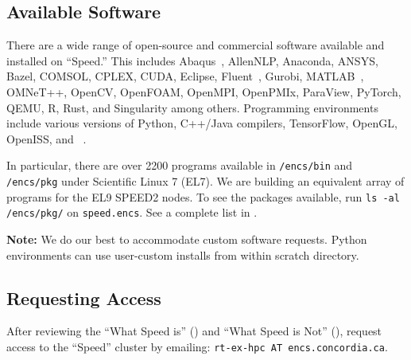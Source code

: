 \subsection{Available Software}
\label{sect:available-software}

There are a wide range of open-source and commercial software available and installed on ``Speed.''
This includes Abaqus~\cite{abaqus}, AllenNLP, Anaconda, ANSYS, Bazel,
COMSOL, CPLEX, CUDA, Eclipse, Fluent~\cite{fluent}, Gurobi, MATLAB~\cite{matlab,scholarpedia-matlab},
OMNeT++, OpenCV, OpenFOAM, OpenMPI, OpenPMIx, ParaView, PyTorch, QEMU, R, Rust, and Singularity among others.
Programming environments include various versions of Python, C++/Java compilers, TensorFlow, OpenGL, OpenISS, and {\marf}~\cite{marf}.

In particular, there are over 2200 programs available in \texttt{/encs/bin} and \texttt{/encs/pkg} under Scientific Linux 7 (EL7).
We are building an equivalent array of programs for the EL9 SPEED2 nodes. To see the packages available, run \texttt{ls -al /encs/pkg/} on \texttt{speed.encs}.
See a complete list in .

\noindent\textbf{Note:} We do our best to accommodate custom software requests.
Python environments can use user-custom installs from within scratch directory.

\subsection{Requesting Access}
\label{sect:access-requests}

After reviewing the ``What Speed is'' () and
``What Speed is Not'' (), request access to the ``Speed''
cluster by emailing: \texttt{rt-ex-hpc AT encs.concordia.ca}.


